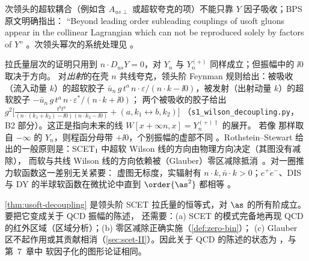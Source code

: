 \begin{remark}[只在领头幂次成立]
次领头的超软耦合（例如含 $A_{us\perp}$ 或超软夸克的项）不能只靠 $Y$ 因子吸收；BPS 原文明确指出：
“Beyond leading order subleading couplings of usoft gluons appear in the collinear Lagrangian which can not be reproduced solely by factors of $Y$”
\cite{BauerPirjolStewart2002}。次领头幂次的系统处理见 \cite{BauerPirjolStewart2002b,BenekeEtAl2002}。
\end{remark}

\begin{remark}[$Y$ 的方向与 $\ii0$]\label{rem:Y-direction}
拉氏量层次的证明只用到 $n\cdot D_{us}Y=0$，对 $Y_n$ 与 $Y_n^{(+)}$ 同样成立；但振幅中的 $\ii0$ 取决于方向。
对\emph{出射}的在壳 $n$ 共线夸克，领头阶 Feynman 规则给出：被吸收（流入动量 $k$）的超软胶子
$\bar u_n\,g\,t^a\,n\cdot\varepsilon/(n\cdot k-\ii0)$，被发射（出射动量 $k$）的超软胶子 $-\bar u_n\,g\,t^a\,n\cdot\varepsilon^*/(n\cdot k+\ii0)$；
两个被吸收的胶子给出 $g^2\big[\frac{t^bt^a}{(n\cdot(k_1+k_2)-\ii0)(n\cdot k_2-\ii0)}+(a,k_1\leftrightarrow b,k_2)\big]$
（\texttt{s1\_\allowbreak wilson\_\allowbreak decoupling.py}，B2 部分）。这正是指向未来的线 $W[x+\infty n,x]=Y_n^{(+)\dagger}$ 的展开。
若像 \cite{BauerPirjolStewart2002,BecherSchwartz2008} 那样取自 $-\infty$ 的 $Y_n$，则程函分母带 $+\ii0$，个别振幅的虚部不同
\cite{ChayEtAl2005}。Rothstein--Stewart 给出的一般原则是：SCET$_{\rm I}$ 中超软 Wilson 线的方向由物理方向决定（其图没有减除），
而软与共线 Wilson 线的方向依赖被（Glauber）零区减除抵消~\cite{RothsteinStewart2016}。对一圈推力软函数这一差别无关紧要：
虚图无标度，实辐射有 $n\cdot k,\bar n\cdot k>0$；$e^+e^-$、DIS 与 DY 的半球软函数在微扰论中直到 $\order{\as^2}$ 都相等
\cite{KangLabunLee2015}。
\end{remark}

\begin{remark}\label{rem:decoupling-QCD}
\cref{thm:usoft-decoupling} 是领头阶 SCET 拉氏量的恒等式，对 $\as$ 的所有阶成立。要把它变成关于 QCD 振幅的陈述，
还需要：(a) SCET 的模式完备地再现 QCD 的红外区域（区域分析）；(b) 零区减除正确实施（\cref{def:zero-bin}）；
(c) Glauber 区不起作用或其贡献相消（\cref{sec:scet-II}）。因此关于 QCD 的陈述的状态为 \tagA，与第~7~章中
软因子化的图形论证相同。
\end{remark}

